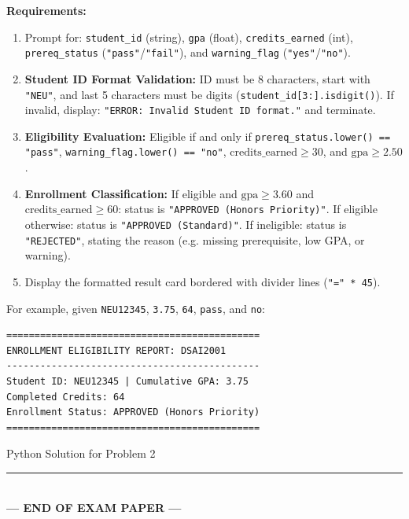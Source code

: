 \documentclass[11pt,a4paper]{article}
\begin{document}
\textbf{Requirements:}
\begin{enumerate}[leftmargin=2em,label=\arabic*.,itemsep=1pt]
  \item Prompt for: \texttt{student\_id} (string), \texttt{gpa} (float), \texttt{credits\_earned} (int), \texttt{prereq\_status} (\texttt{"pass"}/\texttt{"fail"}), and \texttt{warning\_flag} (\texttt{"yes"}/\texttt{"no"}).
  \item \textbf{Student ID Format Validation:} ID must be 8 characters, start with \texttt{"NEU"}, and last 5 characters must be digits (\texttt{student\_id[3:].isdigit()}). If invalid, display: \texttt{"ERROR: Invalid Student ID format."} and terminate.
  \item \textbf{Eligibility Evaluation:} Eligible if and only if \texttt{prereq\_status.lower() == "pass"}, \texttt{warning\_flag.lower() == "no"}, $\text{credits\_earned} \ge 30$, and $\text{gpa} \ge 2.50$.
  \item \textbf{Enrollment Classification:}
    If eligible and $\text{gpa} \ge 3.60$ and $\text{credits\_earned} \ge 60$: status is \texttt{"APPROVED (Honors Priority)"}.
    If eligible otherwise: status is \texttt{"APPROVED (Standard)"}.
    If ineligible: status is \texttt{"REJECTED"}, stating the reason (e.g. missing prerequisite, low GPA, or warning).
  \item Display the formatted result card bordered with divider lines (\texttt{"=" * 45}).
\end{enumerate}

For example, given \texttt{NEU12345}, \texttt{3.75}, \texttt{64}, \texttt{pass}, and \texttt{no}:
\begin{lstlisting}
=============================================
ENROLLMENT ELIGIBILITY REPORT: DSAI2001
---------------------------------------------
Student ID: NEU12345 | Cumulative GPA: 3.75
Completed Credits: 64
Enrollment Status: APPROVED (Honors Priority)
=============================================
\end{lstlisting}

\begin{answerbox}[height=12.0cm]{Python Solution for Problem 2}
\end{answerbox}

\vfill
\begin{center}
  \rule{0.5\textwidth}{0.4pt}\\[1mm]
  \textbf{\color{primaryblue}--- END OF EXAM PAPER ---}
\end{center}
\end{document}
